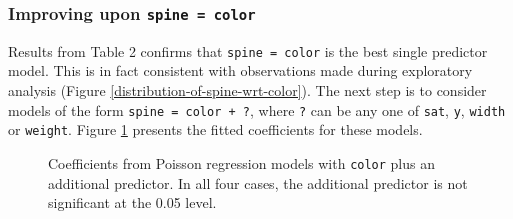 \documentclass[a4paper, 12pt]{article}
\begin{document}
\subsubsection{Improving upon \texttt{spine = color}}

Results from Table 2 confirms that \texttt{spine = color} is the best single predictor model. This is in fact consistent with observations made during exploratory analysis (Figure \ref{distribution-of-spine-wrt-color}). The next step is to consider models of the form \texttt{spine = color + ?}, where \texttt{?} can be any one of \texttt{sat}, \texttt{y}, \texttt{width} or \texttt{weight}. Figure \ref{two-predictor-poisson-models} presents the fitted coefficients for these models.

\begin{figure}[H]
    \centering
    \qquad
    \qquad
    \qquad
    \caption{Coefficients from Poisson regression models with \texttt{color} plus an additional predictor. In all four cases, the additional predictor is not significant at the 0.05 level.}
    \label{two-predictor-poisson-models}
\end{figure}
\end{document}
